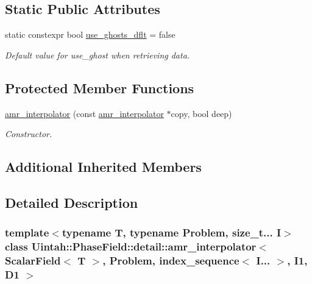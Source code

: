 \subsection*{Static Public Attributes}
\begin{DoxyCompactItemize}
\item 
static constexpr bool \hyperlink{classUintah_1_1PhaseField_1_1detail_1_1amr__interpolator_3_01ScalarField_3_01T_01_4_00_01Problem71844444bc14a03c0566689b6b502040_ad1c55bf968b88ce13f275aa631a69cf7}{use\+\_\+ghosts\+\_\+dflt} = false
\begin{DoxyCompactList}\small\item\em Default value for use\+\_\+ghost when retrieving data. \end{DoxyCompactList}\end{DoxyCompactItemize}
\subsection*{Protected Member Functions}
\begin{DoxyCompactItemize}
\item 
\hyperlink{classUintah_1_1PhaseField_1_1detail_1_1amr__interpolator_3_01ScalarField_3_01T_01_4_00_01Problem71844444bc14a03c0566689b6b502040_a9fbeccc2abec84a86e4238658ce57cc3}{amr\+\_\+interpolator} (const \hyperlink{classUintah_1_1PhaseField_1_1detail_1_1amr__interpolator}{amr\+\_\+interpolator} $\ast$copy, bool deep)
\begin{DoxyCompactList}\small\item\em Constructor. \end{DoxyCompactList}\end{DoxyCompactItemize}
\subsection*{Additional Inherited Members}


\subsection{Detailed Description}
\subsubsection*{template$<$typename T, typename Problem, size\+\_\+t... I$>$\newline
class Uintah\+::\+Phase\+Field\+::detail\+::amr\+\_\+interpolator$<$ Scalar\+Field$<$ T $>$, Problem, index\+\_\+sequence$<$ I... $>$, I1, D1 $>$}

